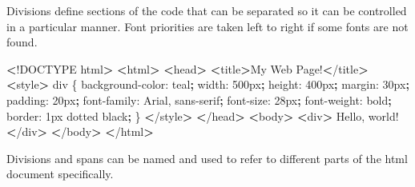 \documentclass[]{book}
\newenvironment{Shaded}{\begin{snugshade}}{\end{snugshade}}
\newcommand{\KeywordTok}[1]{\textcolor[rgb]{0.13,0.29,0.53}{\textbf{#1}}}
\newcommand{\FunctionTok}[1]{\textcolor[rgb]{0.00,0.00,0.00}{#1}}
\newcommand{\OperatorTok}[1]{\textcolor[rgb]{0.81,0.36,0.00}{\textbf{#1}}}
\newcommand{\ExtensionTok}[1]{#1}
\newcommand{\NormalTok}[1]{#1}
\begin{document}
Divisions define sections of the code that can be separated so it can be
controlled in a particular manner. Font priorities are taken left to
right if some fonts are not found.

\begin{Shaded}
\begin{Highlighting}[]
\OperatorTok{<}\NormalTok{!}\ExtensionTok{DOCTYPE}\NormalTok{ html}\OperatorTok{>}                        
\OperatorTok{<}\ExtensionTok{html}\OperatorTok{>}                                 
    \OperatorTok{<}\FunctionTok{head}\OperatorTok{>}                             
        \OperatorTok{<}\ExtensionTok{title}\OperatorTok{>}\NormalTok{My Web Page!}\OperatorTok{<}\NormalTok{/title}\OperatorTok{>}    
        \OperatorTok{<}\ExtensionTok{style}\OperatorTok{>}                        
            \ExtensionTok{div}\NormalTok{ \{                      }
                \ExtensionTok{background-color}\NormalTok{: teal}\KeywordTok{;}
                \ExtensionTok{width}\NormalTok{: 500px}\KeywordTok{;}          
                \ExtensionTok{height}\NormalTok{: 400px}\KeywordTok{;}         
                \ExtensionTok{margin}\NormalTok{: 30px}\KeywordTok{;}
                \ExtensionTok{padding}\NormalTok{: 20px}\KeywordTok{;}
                \ExtensionTok{font-family}\NormalTok{: Arial, sans-serif}\KeywordTok{;}
                \ExtensionTok{font-size}\NormalTok{: 28px}\KeywordTok{;}               
                \ExtensionTok{font-weight}\NormalTok{: bold}\KeywordTok{;}             
                \ExtensionTok{border}\NormalTok{: 1px dotted black}\KeywordTok{;}
\NormalTok{            \}                          }
        \OperatorTok{<}\NormalTok{/}\ExtensionTok{style}\OperatorTok{>}                       
    \OperatorTok{<}\NormalTok{/}\ExtensionTok{head}\OperatorTok{>}                            
    \OperatorTok{<}\ExtensionTok{body}\OperatorTok{>}                             
        \OperatorTok{<}\ExtensionTok{div}\OperatorTok{>}                          
            \ExtensionTok{Hello}\NormalTok{, world!              }
        \OperatorTok{<}\NormalTok{/}\ExtensionTok{div}\OperatorTok{>}                         
    \OperatorTok{<}\NormalTok{/}\ExtensionTok{body}\OperatorTok{>}                            
\OperatorTok{<}\NormalTok{/}\ExtensionTok{html}\OperatorTok{>}                                
\end{Highlighting}
\end{Shaded}

Divisions and spans can be named and used to refer to different parts of
the html document specifically.
\end{document}
